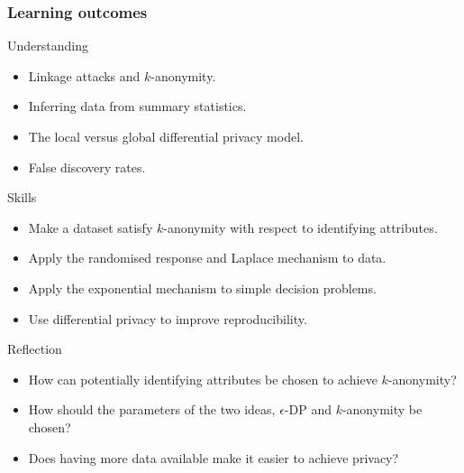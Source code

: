 \begin{frame}
  \frametitle{Learning outcomes}
  \begin{block}{Understanding}
    \begin{itemize}
    \item Linkage attacks and $k$-anonymity.
    \item Inferring data from summary statistics.
    \item The local versus global differential privacy model.
    \item False discovery rates.
    \end{itemize}
  \end{block}
  
  \begin{block}{Skills}
    \begin{itemize}
    \item Make a dataset satisfy $k$-anonymity with respect to identifying attributes.
    \item Apply the randomised response and Laplace mechanism to data.
    \item Apply the exponential mechanism to simple decision problems.
    \item Use differential privacy to improve reproducibility.
    \end{itemize}
  \end{block}

  \begin{block}{Reflection}
    \begin{itemize}
    \item How can potentially identifying attributes be chosen to achieve $k$-anonymity?
    \item How should the parameters of the two ideas, $\epsilon$-DP and $k$-anonymity be chosen?
    \item Does having more data available make it easier to achieve privacy?
    \end{itemize}
  \end{block}

\end{frame}

